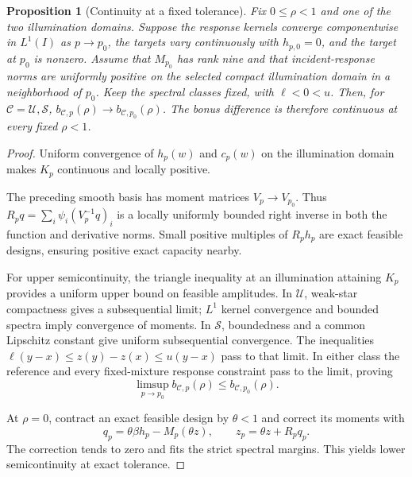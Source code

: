 \documentclass[9pt]{osa-supplemental-document}
\newtheorem{proposition}{Proposition}
\begin{document}
\begin{proposition}[Continuity at a fixed tolerance]\label{prop:continuity}
Fix $0\leq\rho<1$ and one of the two illumination domains. Suppose the response kernels converge componentwise in $L^1(I)$ as $p\to p_0$, the targets vary continuously with $h_{p,0}=0$, and the target at $p_0$ is nonzero. Assume that $M_{p_0}$ has rank nine and that incident-response norms are uniformly positive on the selected compact illumination domain in a neighborhood of $p_0$. Keep the spectral classes fixed, with $\ell<0<u$. Then, for $\mathcal C=\mathcal U,\mathcal S$, $b_{\mathcal C,p}(\rho)\to b_{\mathcal C,p_0}(\rho)$. The bonus difference is therefore continuous at every fixed $\rho<1$.
\end{proposition}
\begin{proof}
Uniform convergence of $h_p(w)$ and $c_p(w)$ on the illumination domain makes $K_p$ continuous and locally positive.

The preceding smooth basis has moment matrices $V_p\to V_{p_0}$. Thus $R_pq=\sum_i\psi_i(V_p^{-1}q)_i$ is a locally uniformly bounded right inverse in both the function and derivative norms. Small positive multiples of $R_ph_p$ are exact feasible designs, ensuring positive exact capacity nearby.

For upper semicontinuity, the triangle inequality at an illumination attaining $K_p$ provides a uniform upper bound on feasible amplitudes. In $\mathcal U$, weak-star compactness gives a subsequential limit; $L^1$ kernel convergence and bounded spectra imply convergence of moments. In $\mathcal S$, boundedness and a common Lipschitz constant give uniform subsequential convergence. The inequalities $\ell(y-x)\leq z(y)-z(x)\leq u(y-x)$ pass to that limit. In either class the reference and every fixed-mixture response constraint pass to the limit, proving
\begin{equation}
 \limsup_{p\to p_0}b_{\mathcal C,p}(\rho)\leq b_{\mathcal C,p_0}(\rho).
\end{equation}

At $\rho=0$, contract an exact feasible design by $\theta<1$ and correct its moments with
\begin{equation}
 q_p=\theta\beta h_p-M_p(\theta z),\qquad z_p=\theta z+R_pq_p.
\end{equation}
The correction tends to zero and fits the strict spectral margins. This yields lower semicontinuity at exact tolerance.


\end{proof}
\end{document}
